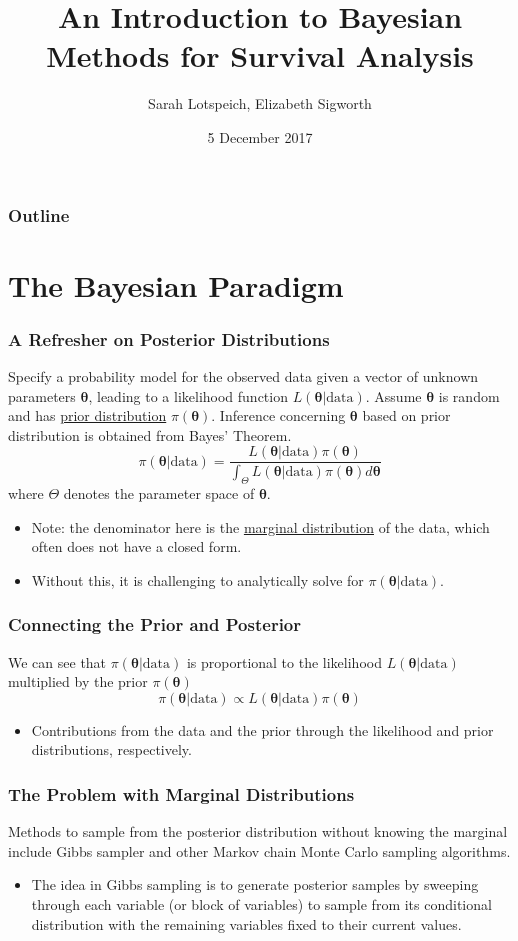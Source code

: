 \documentclass{beamer}
\title{An Introduction to Bayesian Methods for Survival Analysis}
\author{Sarah Lotspeich, Elizabeth Sigworth}
\institute{Vanderbilt University}
\date{5 December 2017}
\begin{document}
\begin{frame}
\titlepage
\end{frame}

\begin{frame}
\frametitle{Outline}
\tableofcontents
\end{frame}

\section{The Bayesian Paradigm}
\begin{frame}
\frametitle{A Refresher on Posterior Distributions}
Specify a probability model for the observed data given a vector of unknown parameters $\pmb{\theta}$, leading to a likelihood function $L(\pmb{\theta}|\text{data})$. Assume $\pmb{\theta}$ is random and has \underline{prior distribution} $\pi(\pmb{\theta})$. Inference concerning $\pmb{\theta}$ based on prior distribution is obtained from Bayes' Theorem. 
$$\pi(\pmb{\theta}|\text{data}) = \frac{L(\pmb{\theta}|\text{data})\pi(\pmb{\theta})}{\int_{\Theta}L(\pmb{\theta}|\text{data})\pi(\pmb{\theta}) d\pmb{\theta}}$$
where $\Theta$ denotes the parameter space of $\pmb{\theta}$. \footnotemark
\begin{itemize}
\item Note: the denominator here is the \underline{marginal distribution} of the data, which often does not have a closed form. 
\item Without this, it is challenging to analytically solve for $\pi(\pmb{\theta}|\text{data})$. 
\end{itemize}
\end{frame}

\begin{frame}
\frametitle{Connecting the Prior and Posterior}
We can see that $\pi(\pmb{\theta}|\text{data})$ is proportional to the likelihood $L(\pmb{\theta}|\text{data})$ multiplied by the prior $\pi(\pmb{\theta})$
$$\pi(\pmb{\theta}|\text{data}) \propto L(\pmb{\theta}|\text{data})\pi(\pmb{\theta})$$
\begin{itemize}
\item Contributions from the data and the prior through the likelihood and prior distributions, respectively. 
\end{itemize}
\end{frame}

\begin{frame}
\frametitle{The Problem with Marginal Distributions}
Methods to sample from the posterior distribution without knowing the marginal include Gibbs sampler and other Markov chain Monte Carlo sampling algorithms. 
\begin{itemize}
\item The idea in Gibbs sampling is to generate posterior samples by sweeping through each variable (or block of variables) to sample from its conditional distribution with the remaining variables fixed to their current values.\footnotemark
\end{itemize}
\end{frame}
\end{document}
